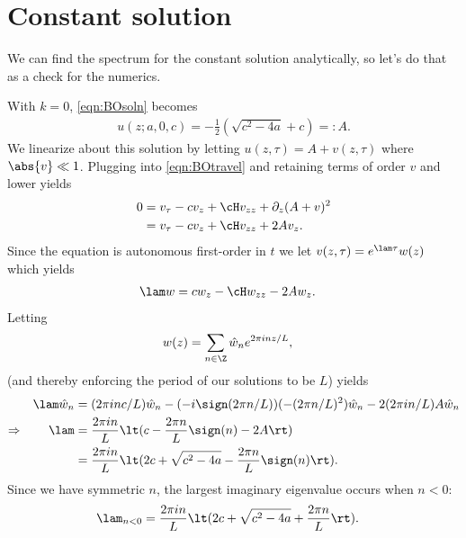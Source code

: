 \documentclass[a4paper,10pt]{article}
\begin{document}
\section{Constant solution}
We can find the spectrum for the constant solution analytically, so let's do
that as a check for the numerics.

With $k=0$, \eqref{eqn:BOsoln} becomes
\begin{align}
  u(z; a,0,c) = -\frac12 (\sqrt{c^2-4a}+c) =: A.
\end{align}
We linearize about this solution by letting $u(z,\tau)= A + v(z,\tau)$ where
$\abs{v}\ll1$. Plugging into \eqref{eqn:BOtravel} and retaining terms of order
$v$ and lower yields
\begin{align}
  0 &= v_\tau -c v_z + \cH v_{zz} + \partial_z(A+v)^2\\
  &= v_\tau -cv_z + \cH v_{zz} + 2A v_z.
\end{align}
Since the equation is autonomous first-order in $t$ we let $v(z,\tau) = e^{\lam
\tau}w(z)$ which yields
\begin{align}
  \lam w &= c w_z -\cH w_{zz} - 2 A w_z.
\end{align}
Letting
\begin{align}
  w(z) &= \sum_{n\in \Z} \hat w_n e^{2\pi i n z/L},
\end{align}
(and thereby enforcing the period of our solutions to be $L$) yields
\begin{align}
  \lam \hat w_n &= (2 \pi i n c/L)\hat w_n- (-i\sign(2\pi n/L))(-(2\pi n/L)^2)
  \hat w_n - 2(2\pi i n/L)A \hat w_n\\ 
  \Rightarrow \qquad \lam &= \frac{2\pi i n}{L}\lt( c -  \frac{2 \pi
  n}{L}\sign(n) - 2 A\rt)\\
  &= \frac{2\pi i n}{L}\lt( 2c + \sqrt{c^2-4a} - \frac{2\pi n}{L}\sign(n)\rt).
\end{align}
Since we have symmetric $n$, the largest imaginary eigenvalue occurs when $n<0$:
\begin{align}
  \lam_{n<0} &= \frac{2 \pi i n}{L}\lt(2c + \sqrt{c^2-4a} + \frac{2\pi
  n}{L}\rt).
\end{align}






{\footnotesize

}
\end{document}
